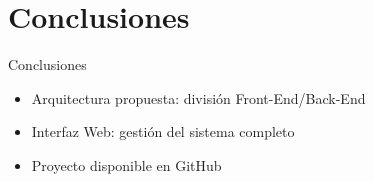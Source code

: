 \section{Conclusiones}

\begin{frame}{Conclusiones}
  \begin{itemize}[<alert@+>]
    \item Arquitectura propuesta: división Front-End/Back-End
    \item Interfaz Web: gestión del sistema completo
    \item Proyecto disponible en GitHub
  \end{itemize}
\end{frame}
